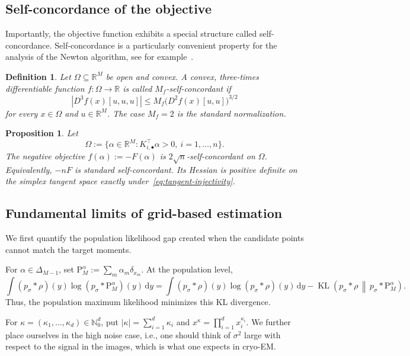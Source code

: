 \documentclass[12pt]{iopart}
\providecommand{\diff}{\mathrm{d}}
\newtheorem{dfn}{Definition}
\newtheorem{prop}{Proposition}
\theoremstyle{remark}
\begin{document}
\subsection{Self-concordance of the objective}

Importantly, the objective function exhibits a special structure called self-concordance. Self-concordance is a particularly convenient property for the analysis of the Newton algorithm, see for example~\citet{boyd2004convex}.  



\begin{dfn}
\label{dfn: SelfConcordance}
Let $\Omega\subseteq\mathbb R^M$ be open and convex. A convex,
three-times differentiable function $f:\Omega\to\mathbb R$ is called
$M_f$-self-concordant if
\[
|D^3f(x)[u,u,u]|
\leq
M_f\bigl(D^2f(x)[u,u]\bigr)^{3/2}
\]
for every $x\in\Omega$ and $u\in\mathbb R^M$. The case $M_f=2$ is the
standard normalization.
\end{dfn}

\begin{prop}
\label{prop: Self-Conc}
Let
\[
\Omega:=\big\{\alpha\in\mathbb R^M:
K_{i,\bullet}^\top\alpha>0,\ i=1,\ldots,n\big\}.
\]
The negative objective $f(\alpha):=-F(\alpha)$ is
$2\sqrt n$-self-concordant on $\Omega$. Equivalently, $-nF$ is standard
self-concordant. Its Hessian is positive definite on the simplex tangent
space exactly under~\eqref{eq:tangent-injectivity}.
\end{prop}


\subsection{Fundamental limits of grid-based estimation}
\label{sec: LimGrids}



We first quantify the population likelihood gap created when the candidate
points cannot match the target moments.

For $\alpha\in\Delta_{M-1}$, set
$\mathrm P_M^\alpha:=\sum_m\alpha_m\delta_{x_m}$.
At the population level,
\[
\int (p_\sigma*\rho)(y)\log (p_\sigma*\mathrm P_M^\alpha)(y)\,\diff y
=\int (p_\sigma*\rho)(y)\log (p_\sigma*\rho)(y)\,\diff y
-\operatorname{KL}\!\left(p_\sigma*\rho\,\middle\|\,
p_\sigma*\mathrm P_M^\alpha\right).
\]
Thus, the population maximum likelihood minimizes this KL divergence.

 

For
$\kappa=(\kappa_1,\ldots,\kappa_d)\in\mathbb N_0^d$, put
$|\kappa|=\sum_{i=1}^d\kappa_i$ and
$x^\kappa=\prod_{i=1}^d x_i^{\kappa_i}$.
 We further place ourselves in the high noise case, i.e., one should think of $\sigma^2$ large with respect to the signal in the images, which is what one expects in cryo-EM.
\end{document}
